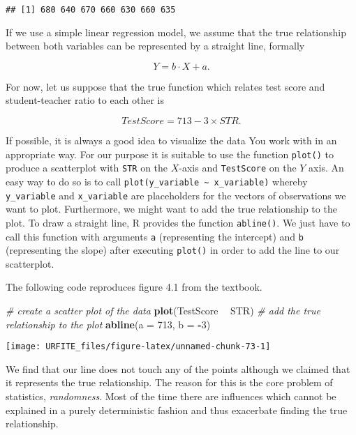 \documentclass[]{book}
\newenvironment{Shaded}{\begin{snugshade}}{\end{snugshade}}
\newcommand{\KeywordTok}[1]{\textcolor[rgb]{0.13,0.29,0.53}{\textbf{#1}}}
\newcommand{\DataTypeTok}[1]{\textcolor[rgb]{0.13,0.29,0.53}{#1}}
\newcommand{\DecValTok}[1]{\textcolor[rgb]{0.00,0.00,0.81}{#1}}
\newcommand{\StringTok}[1]{\textcolor[rgb]{0.31,0.60,0.02}{#1}}
\newcommand{\CommentTok}[1]{\textcolor[rgb]{0.56,0.35,0.01}{\textit{#1}}}
\newcommand{\OperatorTok}[1]{\textcolor[rgb]{0.81,0.36,0.00}{\textbf{#1}}}
\newcommand{\NormalTok}[1]{#1}
\theoremstyle{definition}
\theoremstyle{definition}
\theoremstyle{definition}
\theoremstyle{remark}
\begin{document}
\begin{verbatim}
## [1] 680 640 670 660 630 660 635
\end{verbatim}

If we use a simple linear regression model, we assume that the true
relationship between both variables can be represented by a straight
line, formally

\[ Y = b \cdot X + a. \]

For now, let us suppose that the true function which relates test score
and student-teacher ratio to each other is

\[TestScore = 713 - 3 \times STR.\]

If possible, it is always a good idea to visualize the data You work
with in an appropriate way. For our purpose it is suitable to use the
function \texttt{plot()} to produce a scatterplot with \texttt{STR} on
the \(X\)-axis and \texttt{TestScore} on the \(Y\) axis. An easy way to
do so is to call
\texttt{plot(y\_variable\ \textasciitilde{}\ x\_variable)} whereby
\texttt{y\_variable} and \texttt{x\_variable} are placeholders for the
vectors of observations we want to plot. Furthermore, we might want to
add the true relationship to the plot. To draw a straight line, R
provides the function \texttt{abline()}. We just have to call this
function with arguments \texttt{a} (representing the intercept) and
\texttt{b} (representing the slope) after executing \texttt{plot()} in
order to add the line to our scatterplot.

The following code reproduces figure 4.1 from the textbook.

\begin{Shaded}
\begin{Highlighting}[]
\CommentTok{# create a scatter plot of the data}
\KeywordTok{plot}\NormalTok{(TestScore }\OperatorTok{~}\StringTok{ }\NormalTok{STR)}
\CommentTok{# add the true relationship to the plot}
\KeywordTok{abline}\NormalTok{(}\DataTypeTok{a =} \DecValTok{713}\NormalTok{, }\DataTypeTok{b =} \OperatorTok{-}\DecValTok{3}\NormalTok{)}
\end{Highlighting}
\end{Shaded}

\begin{center}\texttt{[image: URFITE\_files/figure-latex/unnamed-chunk-73-1]} \end{center}

We find that our line does not touch any of the points although we
claimed that it represents the true relationship. The reason for this is
the core problem of statistics, \emph{randomness}. Most of the time
there are influences which cannot be explained in a purely deterministic
fashion and thus exacerbate finding the true relationship.
\end{document}
